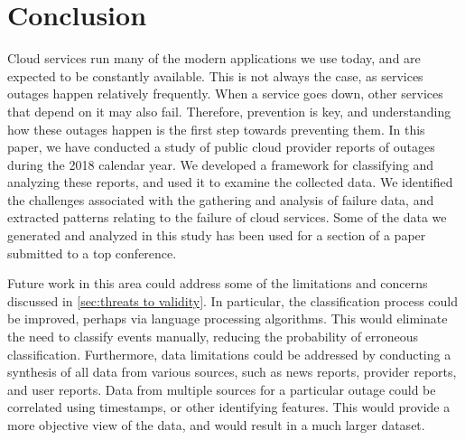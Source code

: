 \section{Conclusion}
Cloud services run many of the modern applications we use today, and are expected to be constantly available.
This is not always the case, as services outages happen relatively frequently.
When a service goes down, other services that depend on it may also fail.
Therefore, prevention is key, and understanding how these outages happen is the first step towards preventing them.
In this paper, we have conducted a study of public cloud provider reports of outages during the 2018 calendar year.
We developed a framework for classifying and analyzing these reports, and used it to examine the collected data.
We identified the challenges associated with the gathering and analysis of failure data, and extracted patterns relating to the failure of cloud services.
Some of the data we generated and analyzed in this study has been used for a section of a paper submitted to a top conference.

Future work in this area could address some of the limitations and concerns discussed in \autoref{sec:threats to validity}.
In particular, the classification process could be improved, perhaps via language processing algorithms.
This would eliminate the need to classify events manually, reducing the probability of erroneous classification.
Furthermore, data limitations could be addressed by conducting a synthesis of all data from various sources, such as news reports, provider reports, and user reports.
Data from multiple sources for a particular outage could be correlated using timestamps, or other identifying features.
This would provide a more objective view of the data, and would result in a much larger dataset.
